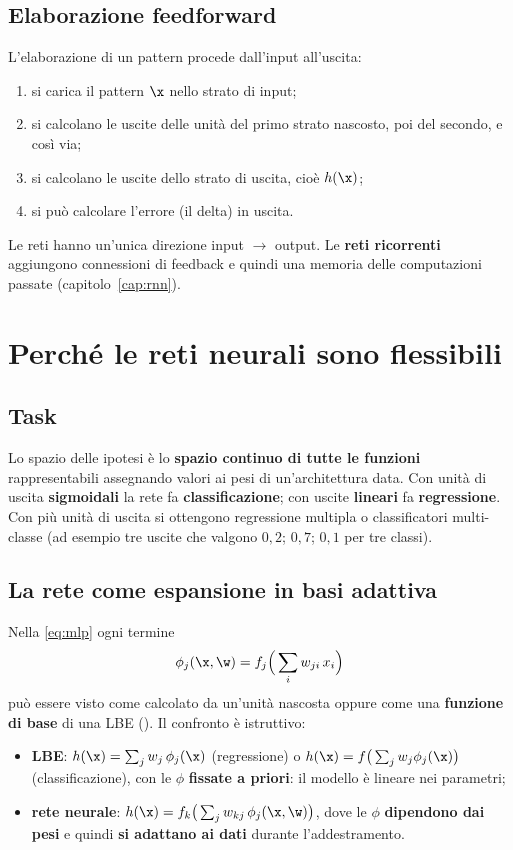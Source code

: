 \subsection{Elaborazione feedforward}

L'elaborazione di un pattern procede dall'input all'uscita:
\begin{enumerate}
  \item si carica il pattern $\x$ nello strato di input;
  \item si calcolano le uscite delle unità del primo strato nascosto, poi del secondo, e così via;
  \item si calcolano le uscite dello strato di uscita, cioè $h(\x)$;
  \item si può calcolare l'errore (il delta) in uscita.
\end{enumerate}
Le reti  hanno un'unica direzione input $\to$ output. Le \textbf{reti ricorrenti} aggiungono
connessioni di feedback e quindi una memoria delle computazioni passate (capitolo~\ref{cap:rnn}).

\section{Perché le reti neurali sono flessibili}

\subsection{Task}
Lo spazio delle ipotesi è lo \textbf{spazio continuo di tutte le funzioni} rappresentabili assegnando valori ai
pesi di un'architettura data. Con unità di uscita \textbf{sigmoidali} la rete fa \textbf{classificazione}; con
uscite \textbf{lineari} fa \textbf{regressione}. Con più unità di uscita si ottengono regressione multipla o
classificatori multi-classe (ad esempio tre uscite che valgono $0{,}2$; $0{,}7$; $0{,}1$ per tre classi).

\subsection{La rete come espansione in basi adattiva}
\label{sec:lbe-adattiva}

Nella \eqref{eq:mlp} ogni termine
\[
\phi_j(\x,\w) = f_j\Big(\sum_iw_{ji}\,x_i\Big)
\]
può essere visto come calcolato da un'unità nascosta oppure come una \textbf{funzione di base} di una LBE
(). Il confronto è istruttivo:
\begin{itemize}
  \item \textbf{LBE}: $h(\x) = \sum_jw_j\,\phi_j(\x)$ (regressione) o $h(\x) = f\big(\sum_jw_j\phi_j(\x)\big)$
        (classificazione), con le $\phi$ \textbf{fissate a priori}: il modello è lineare nei parametri;
  \item \textbf{rete neurale}: $h(\x) = f_k\big(\sum_jw_{kj}\,\phi_j(\x,\w)\big)$, dove le $\phi$ \textbf{dipendono dai
        pesi} e quindi \textbf{si adattano ai dati} durante l'addestramento.
\end{itemize}

